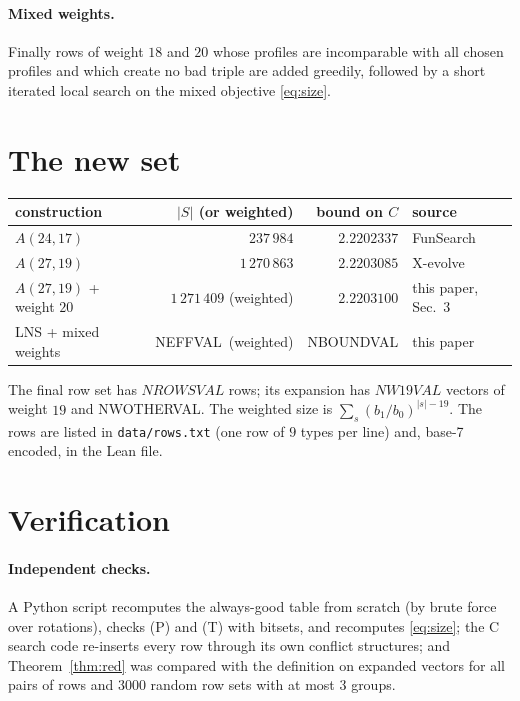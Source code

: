 \documentclass[11pt]{article}
\numberwithin{equation}{section}
\theoremstyle{definition}
\theoremstyle{remark}
\newcommand{\NROWS}{NROWSVAL}
\newcommand{\NWNINE}{NW19VAL}
\newcommand{\NWOTHER}{NWOTHERVAL}
\newcommand{\NEFF}{NEFFVAL}
\newcommand{\NBOUND}{NBOUNDVAL}
\begin{document}
\paragraph{Mixed weights.}  Finally rows of weight $18$ and $20$ whose profiles are incomparable with
all chosen profiles and which create no bad triple are added greedily, followed by a short iterated
local search on the mixed objective \eqref{eq:size}.

\section{The new set}
\begin{center}
\begin{tabular}{lrrl}
\toprule
construction & $|S|$ (or weighted) & bound on $C$ & source\\
\midrule
$A(24,17)$ & $237\,984$ & $2.2202337$ & FunSearch \cite{FunSearch}\\
$A(27,19)$ & $1\,270\,863$ & $2.2203085$ & X-evolve \cite{Xevolve}\\
$A(27,19)$ + weight $20$ & $1\,271\,409$ (weighted) & $2.2203100$ & this paper, Sec.~3\\
LNS + mixed weights & \NEFF\ (weighted) & \NBOUND & this paper\\
\bottomrule
\end{tabular}
\end{center}
The final row set has $\NROWS$ rows; its expansion has $\NWNINE$ vectors of weight $19$ and \NWOTHER.
The weighted size is $\sum_{s} (b_1/b_0)^{|s|-19}$.  The rows are listed in
\texttt{data/rows.txt} (one row of $9$ types per line) and, base-7 encoded, in the Lean file.

\section{Verification}
\paragraph{Independent checks.}  A Python script recomputes the always-good table from scratch (by brute
force over rotations), checks (P) and (T) with bitsets, and recomputes \eqref{eq:size}; the C search code
re-inserts every row through its own conflict structures; and Theorem~\ref{thm:red} was compared with the
definition on expanded vectors for all pairs of rows and $3000$ random row sets with at most $3$ groups.
\end{document}
